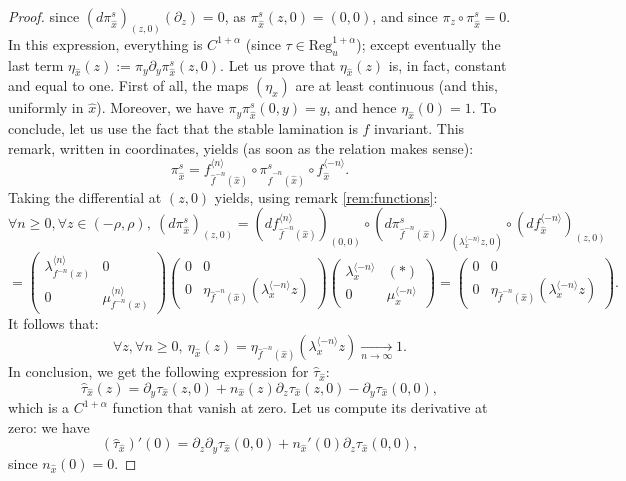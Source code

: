 \documentclass[a4paper]{article}
\theoremstyle{definition}
\begin{document}
\begin{proof}
since $(d\pi_{\widehat{x}}^s)_{(z,0)}(\partial_z) = 0$, as $\pi_{\widehat{x}}^s(z,0) = (0,0)$, and since $\pi_z \circ \pi_{\widehat{x}}^s = 0$.
In this expression, everything is $C^{1+\alpha}$ (since $\tau \in \text{Reg}_u^{1+\alpha}$); except eventually the last term $\eta_{\widehat{x}}(z) := \pi_y \partial_y \pi_{\widehat{x}}^s(z,0)$. Let us prove that $\eta_{\widehat{x}}(z) $ is, in fact, constant and equal to one. First of all, the maps $(\eta_{\widehat{x}})$ are at least continuous (and this, uniformly in ${\widehat{x}}$). Moreover, we have $\pi_y \pi_{\widehat{x}}^s(0,y) = y$, and hence $\eta_{\widehat{x}}(0)=1$. To conclude, let us use the fact that the stable lamination is $f$ invariant. This remark, written in coordinates, yields (as soon as the relation makes sense):
$$ \pi_{\widehat{x}}^s = f_{\widehat{f}^{-n}({\widehat{x}})}^{\langle n \rangle} \circ \pi_{\widehat{f}^{-n}({\widehat{x}})}^s \circ f_{\widehat{x}}^{\langle -n \rangle}. $$
Taking the differential at $(z,0)$ yields, using remark \ref{rem:functions}:
$$ \forall n \geq 0, \forall z \in (-\rho,\rho), \ (d\pi_{\widehat{x}}^s)_{(z,0)} = (df_{\widehat{f}^{-n}({\widehat{x}})}^{\langle n \rangle})_{(0,0)} \circ (d\pi^s_{\widehat{f}^{-n}({\widehat{x}})})_{(\lambda_x^{\langle -n \rangle}z,0)} \circ (df_{\widehat{x}}^{\langle -n \rangle})_{(z,0)} $$ $$=\begin{pmatrix} \lambda_{f^{-n}(x)}^{\langle n \rangle} & 0 \\ 0 & \mu_{f^{-n}(x)}^{\langle n \rangle} \end{pmatrix} \begin{pmatrix} 0 & 0 \\ 0 & \eta_{\widehat{f}^{-n}({\widehat{x}})}(\lambda_x^{\langle -n \rangle} z) \end{pmatrix}  \begin{pmatrix} \lambda_x^{\langle -n \rangle} & (*) \\ 0 & \mu_{x}^{\langle -n \rangle} \end{pmatrix} = \begin{pmatrix} 0 & 0 \\ 0 & \eta_{\widehat{f}^{-n}({\widehat{x}})}(\lambda_x^{\langle -n \rangle} z) \end{pmatrix} .$$
It follows that: 
$$ \forall z, \forall n \geq 0, \ \eta_{\widehat{x}}(z) = \eta_{\widehat{f}^{-n}({\widehat{x}})}(\lambda_{{x}}^{\langle -n \rangle} z) \underset{n \rightarrow \infty}{\longrightarrow} 1 .$$
In conclusion, we get the following expression for $\widehat{\tau}_{\widehat{x}}$:
$$ \widehat{\tau}_{\widehat{x}}(z) = \partial_y \tau_{\widehat{x}}(z,0) + n_{\widehat{x}}(z) \partial_z \tau_{\widehat{x}}(z,0) - \partial_y \tau_{\widehat{x}}(0,0), $$
which is a $C^{1+\alpha}$ function that vanish at zero. Let us compute its derivative at zero: we have
$$ (\widehat{\tau}_{\widehat{x}})'(0) = \partial_z \partial_y \tau_{\widehat{x}}(0,0) + n_{\widehat{x}}'(0) \partial_z \tau_{\widehat{x}}(0,0),$$
since $n_{\widehat{x}}(0)=0$.\end{proof}
\end{document}
